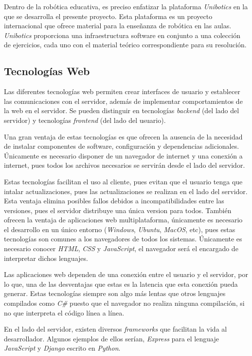 \documentclass[a4paper, 12pt]{book}
\begin{document}
Dentro de la robótica educativa, es preciso enfatizar la plataforma \textit{Unibotics} en la que se desarrolla el presente proyecto. Esta plataforma es un proyecto internacional que ofrece material para la enseñanza de robótica en las aulas. \textit{Unibotics} proporciona una infraestructura software en conjunto a una colección de ejercicios, cada uno con el material teórico correspondiente para su resolución.

\subsection{Tecnologías Web}

Las diferentes tecnologías web permiten crear interfaces de usuario y establecer las comunicaciones con el servidor, además de implementar comportamientos de la web en el servidor. Se pueden distinguir en tecnologías \emph{backend} (del lado del servidor) y tecnologías \emph{frontend} (del lado del usuario).

Una gran ventaja de estas tecnologías es que ofrecen la ausencia de la necesidad de instalar componentes de software, configuración y dependencias adicionales. Únicamente es necesario disponer de un navegador de internet y una conexión a internet, pues todos los archivos necesarios se servirán desde el lado del servidor.

Estas tecnologías facilitan el uso al cliente, pues evitan que el usuario tenga que intalar actualizaciones, pues las actualizaciones se realizan en el lado del servidor. Esta ventaja elimina posibles fallos debidos a incompatibilidades entre las versiones, pues el servidor distribuye una única version para todos. También ofrecen la ventaja de aplicaciones web multiplataforma, únicamente es necesario el desarrollo en un único entorno (\emph{Windows}, \emph{Ubuntu}, \emph{MacOS}, etc), pues estas tecnologías son comunes a los navegadores de todos los sistemas. Únicamente es necesario conocer \emph{HTML}, \emph{CSS} y \emph{JavaScript}, el navegador será el encargado de interpretar dichos lenguajes.

Las aplicaciones web dependen de una conexión entre el usuario y el servidor, por lo que, una de las desventajas que estas es la latencia que esta conexión pueda generar. Estas tecnologías siempre son algo más lentas que otros lenguajes compilados como \emph{C\#} puesto que el navegador no realiza ninguna compilación, si no que interpreta el código línea a línea.

En el lado del servidor, existen diversos \emph{frameworks} que facilitan la vida al desarrollador. Algunos ejemplos de ellos serían, \emph{Express} para el lenguaje \emph{JavaScript} y \emph{Django} escrito en \emph{Python}.
\end{document}
